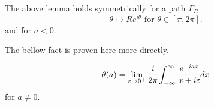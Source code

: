 \documentclass[main.tex]{subfiles}
\begin{document}
\begin{corollary}
\label{cancel-half-circle-cor}
The above lemma holds symmetrically for a path $\Gamma_R$
\begin{equation}
\theta \mapsto Re^{i\theta} \text{ for } \theta\in[\pi, 2\pi].
\end{equation}
and for $a < 0$.
\end{corollary}

The bellow fact is proven here more directly.

\begin{proposition}
\begin{equation}
\theta(a) = \lim\limits_{\epsilon\to 0^+} \cfrac{i}{2\pi} \int_{-\infty}^\infty  \cfrac{e^{-iax}}{x + i\epsilon} dx
\end{equation}
for $a\not=0$.
\end{proposition}
\end{document}
